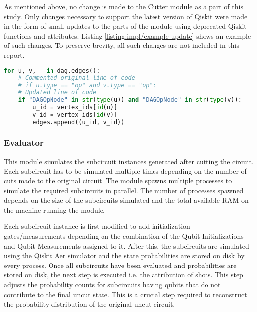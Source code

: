 As mentioned above, no change is made to the Cutter module as a part of this study. Only changes necessary to support the latest version of Qiskit were made in the form of small updates to the parts of the module using deprecated Qiskit functions and attributes. Listing \ref{listing:impl/example-update} shows an example of such changes. To preserve brevity, all such changes are not included in this report.

\vspace{\baselineskip}
\begin{lstlisting}[caption={ Example for changes made to ensure compatibility with the latest Qiskit version 1.0.2. The original line of code on Line 3 is commented and the updated line of code is shown on Line 5. The code checks if both vertices of an edge are ``Gate operations" and adds them to a list if \textit{true}. },
label={listing:impl/example-update},
language=Python,
float]
for u, v, _ in dag.edges():
    # Commented original line of code
    # if u.type == "op" and v.type == "op":
    # Updated line of code
    if "DAGOpNode" in str(type(u)) and "DAGOpNode" in str(type(v)):
        u_id = vertex_ids[id(u)]
        v_id = vertex_ids[id(v)]
        edges.append((u_id, v_id))
\end{lstlisting}


\subsubsection{Evaluator}

This module simulates the subcircuit instances generated after cutting the circuit. Each subcircuit has to be simulated multiple times depending on the number of cuts made to the original circuit. The module spawns multiple processes to simulate the required subcircuits in parallel. The number of processes spawned depends on the size of the subcircuits simulated and the total available RAM on the machine running the module.  

Each subcircuit instance is first modified to add initialization gates/measurements depending on the combination of the Qubit Initializations and Qubit Measurements assigned to it. After this, the subcircuits are simulated using the Qiskit Aer simulator and the state probabilities are stored on disk by every process. Once all subcircuits have been evaluated and probabilities are stored on disk, the next step is executed i.e. the attribution of shots. This step adjusts the probability counts for subcircuits having qubits that do not contribute to the final uncut state. This is a crucial step required to reconstruct the probability distribution of the original uncut circuit.  

